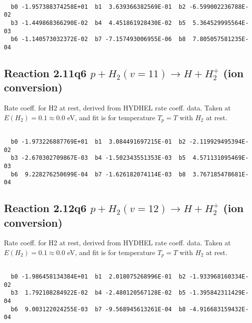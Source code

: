 \documentclass[12pt,dvipdfmx]{article}
\begin{document}
\begin{small}\begin{verbatim}

  b0 -1.957388374258E+01  b1  3.639366382569E-01  b2 -6.599002236788E-02
  b3 -1.449868366290E-02  b4  4.451861928430E-02  b5  5.364529995564E-03
  b6 -1.140573032372E-02  b7 -7.157493006955E-06  b8  7.805057581235E-04

\end{verbatim}\end{small}

\newpage
\subsection{
Reaction 2.11q6
$ p + H_2(v=11) \rightarrow H + H_2^+$ (ion conversion)
}
Rate coeff. for H2 at rest, derived from HYDHEL rate coeff. data.
Taken at $E(H_2) = 0.1 \approx 0.0$ eV,  and fit is for temperature $T_p=T$ with $H_2$ at rest.

\begin{small}\begin{verbatim}

  b0 -1.973226887769E+01  b1  3.084491697215E-01  b2 -2.119929495394E-02
  b3 -2.670302709867E-03  b4 -1.502343551353E-03  b5  4.571131095469E-03
  b6  9.228276250699E-04  b7 -1.626182074114E-03  b8  3.767185478681E-04

\end{verbatim}\end{small}

\newpage
\subsection{
Reaction 2.12q6
$ p + H_2(v=12) \rightarrow H + H_2^+$ (ion conversion)
}
Rate coeff. for H2 at rest, derived from HYDHEL rate coeff. data.
Taken at $E(H_2) = 0.1 \approx 0.0$ eV,  and fit is for temperature $T_p=T$ with $H_2$ at rest.

\begin{small}\begin{verbatim}

  b0 -1.986458134384E+01  b1  2.018075268996E-01  b2 -1.933968160334E-02
  b3  1.792108284922E-02  b4 -2.480120567128E-02  b5 -1.395842311429E-04
  b6  9.003122024255E-03  b7 -9.568945613261E-04  b8 -4.916683159432E-04

\end{verbatim}\end{small}

\newpage
\end{document}
